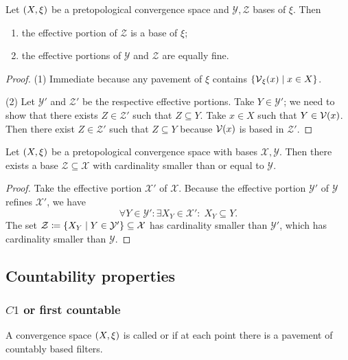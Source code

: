 \begin{lemma}
Let $\sSet{X,\xi}$ be a pretopological convergence space and $\mathcal{Y}, \mathcal{Z}$ bases of $\xi$. Then
\begin{enumerate}
\item the effective portion of $\mathcal{Z}$ is a base of $\xi$;
\item the effective portions of $\mathcal{Y}$ and $\mathcal{Z}$ are equally fine.
\end{enumerate}
\end{lemma}
\begin{proof}
(1) Immediate because any pavement of $\xi$ contains $\setbuilder{\vicinity_\xi(x)}{x\in X}$.

(2) Let $\mathcal{Y}'$ and $\mathcal{Z}'$ be the respective effective portions. Take $Y\in \mathcal{Y}'$; we need to show that there exists $Z\in \mathcal{Z}'$ such that $Z\subseteq Y$. Take $x\in X$ such that $Y\in \operatorname{\mathcal{V}}(x)$. Then there exist $Z \in \mathcal{Z}'$ such that $Z\subseteq Y$ because $\operatorname{\mathcal{V}}(x)$ is based in $\mathcal{Z}'$. 
\end{proof}
\begin{corollary} \label{cardinalityPretopologicalBase}
Let $\sSet{X,\xi}$ be a pretopological convergence space with bases $\mathcal{X},\mathcal{Y}$. Then there exists a base $\mathcal{Z} \subseteq \mathcal{X}$ with cardinality smaller than or equal to $\mathcal{Y}$.
\end{corollary}
\begin{proof}
Take the effective portion $\mathcal{X}'$ of $\mathcal{X}$. Because the effective portion $\mathcal{Y}'$ of $\mathcal{Y}$ refines $\mathcal{X}'$, we have
\[ \forall Y\in \mathcal{Y}': \exists X_Y \in \mathcal{X}': \; X_Y\subseteq Y. \]
The set $\mathcal{Z} \defeq \setbuilder{X_Y}{Y\in \mathcal{Y}'} \subseteq \mathcal{X}$ has cardinality smaller than $\mathcal{Y}'$, which has cardinality smaller than $\mathcal{Y}$.
\end{proof}

\subsection{Countability properties}
\subsubsection{$C1$ or first countable}
\begin{definition}
A convergence space $\sSet{X, \xi}$ is called  or  if at each point there is a pavement of countably based filters.
\end{definition}

